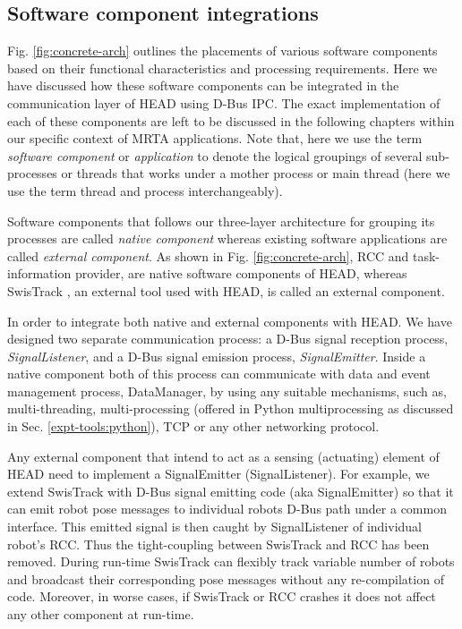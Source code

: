 \subsection{Software component integrations}
\label{expt-tools:arch:integration}
Fig. \ref{fig:concrete-arch} outlines the placements of various software components based on their functional characteristics and processing requirements. Here we have discussed how these  software components can be integrated in the communication layer of HEAD using D-Bus IPC. The exact implementation of each of these components are left to be discussed in the following chapters within our specific context of MRTA applications. Note that, here we use the term {\em software component} or {\em application} to denote the logical groupings of several sub-processes or threads that works under a mother process or main thread (here we use the term thread and process interchangeably).

Software components that follows our three-layer architecture for grouping its processes are called {\em native component} whereas existing software applications are called {\em external component}. As shown in Fig. \ref{fig:concrete-arch}, RCC and task-information provider,   are native software components of HEAD, whereas SwisTrack \cite{Lochmatter+2008}, an external tool used with HEAD, is called an external component.

In order to integrate both native and external components with HEAD. We have designed two separate communication process: a D-Bus signal reception process, {\em SignalListener}, and a D-Bus signal emission process, {\em SignalEmitter}. Inside a native component both of this process can communicate with data and event management process, DataManager, by using any suitable mechanisms, such as, multi-threading, multi-processing (offered in Python multiprocessing as discussed in Sec. \ref{expt-tools:python}), TCP or any other networking protocol.

Any external component that intend to act as a sensing (actuating) element of HEAD need to implement a SignalEmitter (SignalListener). For example, we extend SwisTrack with D-Bus signal emitting code (aka SignalEmitter) so that it can emit robot pose messages to individual robots D-Bus path under a common interface.  This emitted signal is then caught by SignalListener of individual robot's RCC. Thus the tight-coupling between SwisTrack and RCC has been removed. During run-time SwisTrack can flexibly track variable number of robots and broadcast their corresponding pose messages without any re-compilation of code. Moreover, in worse cases, if SwisTrack or RCC crashes it does not affect any other component at run-time.

